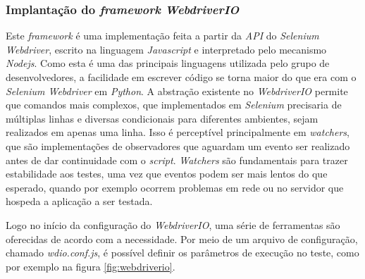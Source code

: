 \hypertarget{implementacao-do-framework-webdriverio}{%
\subsubsection{\texorpdfstring{Implantação do \emph{framework} \emph{WebdriverIO}}{Implantação do framework WebdriverIO}}\label{implementacao-do-framework-webdriverio}}

Este \emph{framework} é uma implementação feita a partir da \emph{API} do \emph{Selenium Webdriver}, escrito na linguagem \emph{Javascript} e interpretado pelo mecanismo \emph{Nodejs}. Como esta é uma das principais linguagens utilizada pelo grupo de desenvolvedores, a facilidade em escrever código se torna maior do que era com o \emph{Selenium Webdriver} em \emph{Python}. A abstração existente no \emph{WebdriverIO} permite que comandos mais complexos, que implementados em \emph{Selenium} precisaria de múltiplas linhas e diversas condicionais para diferentes ambientes, sejam realizados em apenas uma linha. Isso é perceptível principalmente em \emph{watchers}, que são implementações de observadores que aguardam um evento ser realizado antes de dar continuidade com o \emph{script}. \emph{Watchers} são fundamentais para trazer estabilidade aos testes, uma vez que eventos podem ser mais lentos do que esperado, quando por exemplo ocorrem problemas em rede ou no servidor que hospeda a aplicação a ser testada.

Logo no início da configuração do \emph{WebdriverIO}, uma série de ferramentas são oferecidas de acordo com a necessidade. Por meio de um arquivo de configuração, chamado \emph{wdio.conf.js}, é possível definir os parâmetros de execução no teste, como por exemplo na figura \ref{fig:webdriverio}.

